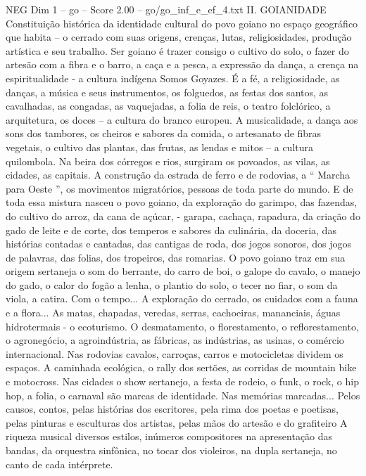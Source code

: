 \begin{textsample}{NEG Dim 1 – go – Score 2.00 – go/go\_inf\_e\_ef\_4.txt}  \label{ex:f1_neg_195}
II.
GOIANIDADE Constituição histórica da identidade cultural do povo goiano no espaço geográfico que habita – o cerrado com suas origens, crenças, lutas, religiosidades, produção artística e seu trabalho.
Ser goiano é trazer consigo o cultivo do solo, o fazer do artesão com a fibra e o barro, a caça e a pesca, a expressão da dança, a crença na espiritualidade - a cultura indígena Somos Goyazes.
É a fé, a religiosidade, as danças, a música e seus instrumentos, os folguedos, as festas dos santos, as cavalhadas, as congadas, as vaquejadas, a folia de reis, o teatro folclórico, a arquitetura, os doces – a cultura do branco europeu.
A musicalidade, a dança aos sons dos tambores, os cheiros e sabores da comida, o artesanato de fibras vegetais, o cultivo das plantas, das frutas, as lendas e mitos – a cultura quilombola.
Na beira dos córregos e rios, surgiram os povoados, as vilas, as cidades, as capitais.
A construção da estrada de ferro e de rodovias, a “ Marcha para Oeste ”, os movimentos migratórios, pessoas de toda parte do mundo.
E de toda essa mistura nasceu o povo goiano, da exploração do garimpo, das fazendas, do cultivo do arroz, da cana de açúcar, - garapa, cachaça, rapadura, da criação do gado de leite e de corte, dos temperos e sabores da culinária, da doceria, das histórias contadas e cantadas, das cantigas de roda, dos jogos sonoros, dos jogos de palavras, das folias, dos tropeiros, das romarias.
O povo goiano traz em sua origem sertaneja o som do berrante, do carro de boi, o galope do cavalo, o manejo do gado, o calor do fogão a lenha, o plantio do solo, o tecer no fiar, o som da viola, a catira.
Com o tempo...
A exploração do cerrado, os cuidados com a fauna e a flora...
As matas, chapadas, veredas, serras, cachoeiras, mananciais, águas hidrotermais - o ecoturismo.
O desmatamento, o florestamento, o reflorestamento, o agronegócio, a agroindústria, as fábricas, as indústrias, as usinas, o comércio internacional.
Nas rodovias cavalos, carroças, carros e motocicletas dividem os espaços.
A caminhada ecológica, o rally dos sertões, as corridas de mountain bike e motocross.
Nas cidades o show sertanejo, a festa de rodeio, o funk, o rock, o hip hop, a folia, o carnaval são marcas de identidade.
Nas memórias marcadas...
Pelos causos, contos, pelas histórias dos escritores, pela rima dos poetas e poetisas, pelas pinturas e esculturas dos artistas, pelas mãos do artesão e do grafiteiro A riqueza musical diversos estilos, inúmeros compositores na apresentação das bandas, da orquestra sinfônica, no tocar dos violeiros, na dupla sertaneja, no canto de cada intérprete.

\end{textsample}
